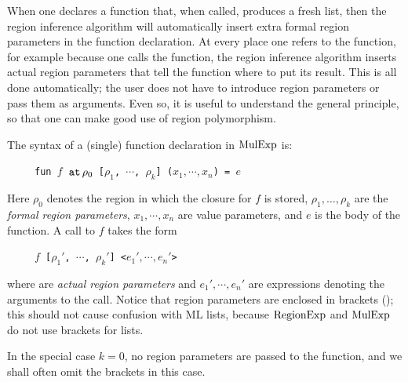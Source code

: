 \documentclass[12pt]{book}
\begin{document}
When one declares a function that, when called, produces a fresh list,
then the region inference algorithm will automatically insert extra
%
formal region parameters in the function declaration.  At every place
one refers to the function, for example because one calls the
function, the region inference algorithm inserts
%
actual region parameters that tell the function where to put its
result. This is all done automatically; the user does not have to
introduce region parameters or pass them as arguments. Even so, it is
useful to understand the general principle, so that one can make good
use of region polymorphism.

The syntax of a (single) function declaration in $\hbox{\rm MulExp}$ is:
\begin{tabbing}
\ \ \ \ \ \=\tt fun $f$ $\mathbin{\hbox{\tt at}}\,\rho_0$ [$\rho_1$, $\cdots$, $\rho_k$] ($x_1,\cdots,x_n$) = $e$
\end{tabbing}
Here $\rho_0$ denotes the region in which the closure for $f$ is
stored, $\rho_1, \ldots,\rho_k$ are the
%
{\em formal region parameters}, $x_1,\cdots,x_n$ are
value parameters, and $e$ is the body of the function.
A call to $f$ takes the form
\begin{tabbing}
\ \ \ \ \ \=\tt $f$  [$\rho_1'$, $\cdots$, $\rho_k'$] <$e_1',\cdots,e_n'$>
\end{tabbing}
where  are
%
{\em actual region parameters} and $e_1',\cdots,e_n'$ are expressions
denoting the arguments to the call. Notice that region parameters are
enclosed in brackets (\boxml{[ ]}); this should not cause confusion
with ML lists, because $\hbox{\rm RegionExp}$ and $\hbox{\rm MulExp}$ do not use
%
brackets for lists.

In the special case $k=0$, no region parameters are passed to the
function, and we shall often omit the brackets in this case.
\end{document}
